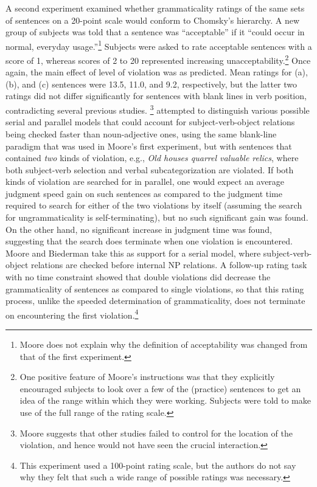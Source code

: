 A second experiment examined whether grammaticality ratings of the same sets of sentences on a 20-point scale would conform to Chomsky's hierarchy. A new group of subjects was told that a sentence was ``acceptable'' if it ``could occur in normal, everyday usage.''\footnote{Moore does not explain why the definition of acceptability was changed from that of the first experiment.}
 Subjects were asked to rate acceptable sentences with a score of  1, whereas scores of 2 to 20 represented increasing unacceptability.\footnote{One positive feature of Moore's instructions was that they explicitly encouraged subjects to look over a few of the (practice) sentences to get an idea of the range within which they were working. Subjects were told to make use of the full range of the rating scale.}
 Once again, the main effect of level of violation was as predicted. Mean ratings for (a), (b), and (c) sentences were 13.5, 11.0, and 9.2, respectively, but the latter two ratings did not differ significantly for sentences with blank lines in verb position, contradicting  several previous studies. 
\footnote{Moore suggests that other studies failed to control for the location of the violation, and hence would not have seen the crucial interaction.}
 \citet{MooreEtAl1979}
attempted to distinguish various possible serial and parallel models that could account for subject-verb-object relations being  checked faster than noun-adjective ones, using the same blank-line paradigm that was used in Moore's first experiment, but with sentences that contained \textit{two} kinds of violation, e.g., \textit{Old houses quarrel valuable relics}, where both subject-verb selection and verbal subcategorization  are violated. If both kinds of violation  are searched for in parallel, one
would expect an average judgment speed gain on such sentences as compared to the judgment time required to search for either of the two violations by itself (assuming the search for ungrammaticality is self-terminating), but no such significant gain was found. On the other hand, no significant increase in judgment time was found, suggesting that the search does terminate when one violation is encountered. Moore and Biederman take this as support for a serial model, where subject-verb-object relations are checked before internal NP relations. A follow-up rating task with no time constraint showed that double violations did decrease the grammaticality of sentences as compared to single violations, so that this rating process, unlike the speeded determination of grammaticality, does not terminate on encountering the first violation.\footnote{This experiment used a 100-point rating scale, but the authors do not say why they felt that such a wide range of possible ratings was necessary.
}


